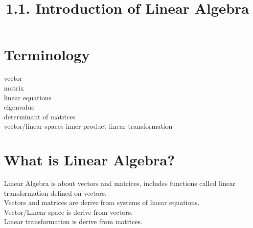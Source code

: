\documentclass[12pt]{article}
\begin{document}
\title{1.1. Introduction of Linear Algebra}
\maketitle

\section{Terminology}
vector\\
matrix\\
linear equations\\
eigenvalue\\
determinant of matrices\\
vector/linear spaces
inner product
linear transformation

\section{What is Linear Algebra?}
Linear Algebra is about vectors and matrices, includes functions called linear transformation defined on vectors.\\
Vectors and matrices are derive from systems of linear equations.\\
Vector/Linear space is derive from vectors.\\
Linear transformation is derive from matrices.\\
\end{document}

